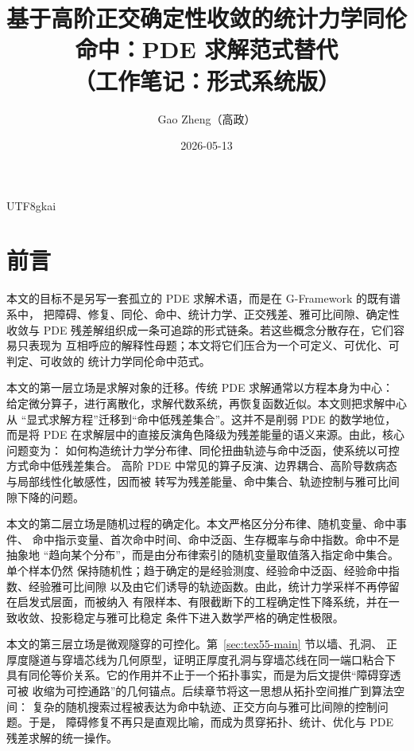 \documentclass[12pt]{article}
\newcommand{\GFramework}{\textsf{G-Framework}}
\begin{document}
\begin{CJK*}{UTF8}{gkai}

\title{基于高阶正交确定性收敛的统计力学同伦命中：PDE 求解范式替代\\（工作笔记：形式系统版）}
\author{Gao Zheng（高政）}
\date{2026-05-13}
\maketitle

\section*{前言}

本文的目标不是另写一套孤立的 PDE 求解术语，而是在 \GFramework{} 的既有谱系中，
把障碍、修复、同伦、命中、统计力学、正交残差、雅可比间隙、确定性收敛与
PDE 残差解组织成一条可追踪的形式链条。若这些概念分散存在，它们容易只表现为
互相呼应的解释性母题；本文将它们压合为一个可定义、可优化、可判定、可收敛的
统计力学同伦命中范式。

本文的第一层立场是求解对象的迁移。传统 PDE 求解通常以方程本身为中心：
给定微分算子，进行离散化，求解代数系统，再恢复函数近似。本文则把求解中心从
“显式求解方程”迁移到“命中低残差集合”。这并不是削弱 PDE 的数学地位，而是将
PDE 在求解层中的直接反演角色降级为残差能量的语义来源。由此，核心问题变为：
如何构造统计力学分布律、同伦扭曲轨迹与命中泛函，使系统以可控方式命中低残差集合。
高阶 PDE 中常见的算子反演、边界耦合、高阶导数病态与局部线性化敏感性，因而被
转写为残差能量、命中集合、轨迹控制与雅可比间隙下降的问题。

本文的第二层立场是随机过程的确定化。本文严格区分分布律、随机变量、命中事件、
命中指示变量、首次命中时间、命中泛函、生存概率与命中指数。命中不是抽象地
“趋向某个分布”，而是由分布律索引的随机变量取值落入指定命中集合。单个样本仍然
保持随机性；趋于确定的是经验测度、经验命中泛函、经验命中指数、经验雅可比间隙
以及由它们诱导的轨迹函数。由此，统计力学采样不再停留在启发式层面，而被纳入
有限样本、有限截断下的工程确定性下降系统，并在一致收敛、投影稳定与雅可比稳定
条件下进入数学严格的确定性极限。

本文的第三层立场是微观隧穿的可控化。第~\ref{sec:tex55-main} 节以墙、孔洞、
正厚度隧道与穿墙芯线为几何原型，证明正厚度孔洞与穿墙芯线在同一端口粘合下
具有同伦等价关系。它的作用并不止于一个拓扑事实，而是为后文提供“障碍穿透可被
收缩为可控通路”的几何锚点。后续章节将这一思想从拓扑空间推广到算法空间：
复杂的随机搜索过程被表达为命中轨迹、正交方向与雅可比间隙的控制问题。于是，
障碍修复不再只是直观比喻，而成为贯穿拓扑、统计、优化与 PDE 残差求解的统一操作。


\end{CJK*}
\end{document}
